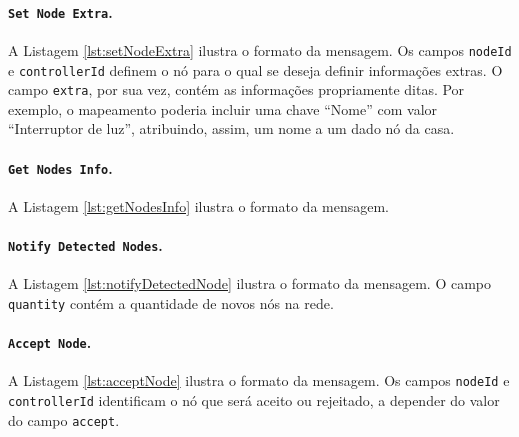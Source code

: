 \noindent
\begin{minipage}[l]{\linewidth}

\end{minipage}

\paragraph*{\texttt{Set Node Extra}.} A Listagem \ref{lst:setNodeExtra} ilustra o formato da mensagem. Os campos \texttt{nodeId} e \texttt{controllerId} definem o nó para o qual se deseja definir informações extras. O campo \texttt{extra}, por sua vez, contém as informações propriamente ditas. Por exemplo, o mapeamento poderia incluir uma chave ``Nome'' com valor ``Interruptor de luz'', atribuindo, assim, um nome a um dado nó da casa.

\noindent
\begin{minipage}[l]{\linewidth}

\end{minipage}

\paragraph*{\texttt{Get Nodes Info}.} A Listagem \ref{lst:getNodesInfo} ilustra o formato da mensagem.

\noindent
\begin{minipage}[l]{\linewidth}

\end{minipage}

\paragraph*{\texttt{Notify Detected Nodes}.} A Listagem \ref{lst:notifyDetectedNode} ilustra o formato da mensagem. O campo \texttt{quantity} contém a quantidade de novos nós na rede.

\noindent
\begin{minipage}[l]{\linewidth}

\end{minipage}

\paragraph*{\texttt{Accept Node}.} A Listagem \ref{lst:acceptNode} ilustra o formato da mensagem. Os campos \texttt{nodeId} e \texttt{controllerId} identificam o nó que será aceito ou rejeitado, a depender do valor do campo \texttt{accept}.

